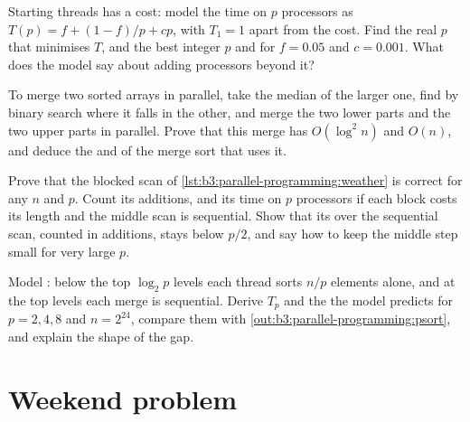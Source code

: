 \begin{exercise}[$\star\star$]\label{exo:b3:parallel-programming:9}
Starting threads has a cost: model the time on $p$ processors as $T(p) = f + (1 - f)/p + cp$, with $T_1 = 1$ apart from the cost. Find the real $p$ that minimises $T$, and the best integer $p$ and  for $f = 0.05$ and $c = 0.001$. What does the model say about adding processors beyond it?
\end{exercise}

\begin{exercise}[$\star\star\star$]\label{exo:b3:parallel-programming:10}
To merge two sorted arrays in parallel, take the median of the larger one, find by binary search where it falls in the other, and merge the two lower parts and the two upper parts in parallel. Prove that this merge has  $O(\log^2 n)$ and  $O(n)$, and deduce the  and  of the merge sort that uses it.
\end{exercise}

\begin{exercise}[$\star\star\star$]\label{exo:b3:parallel-programming:11}
Prove that the blocked scan of \cref{lst:b3:parallel-programming:weather} is correct for any $n$ and $p$. Count its additions, and its time on $p$ processors if each block costs its length and the middle scan is sequential. Show that its  over the sequential scan, counted in additions, stays below $p/2$, and say how to keep the middle step small for very large $p$.
\end{exercise}

\begin{exercise}[$\star\star\star$]\label{exo:b3:parallel-programming:12}
Model : below the top $\log_2 p$ levels each thread sorts $n/p$ elements alone, and at the top levels each merge is sequential. Derive $T_p$ and the  the model predicts for $p = 2, 4, 8$ and $n = 2^{24}$, compare them with \cref{out:b3:parallel-programming:psort}, and explain the shape of the gap.
\end{exercise}

\section{Weekend problem}\label{sec:b3:parallel-programming:problem}

